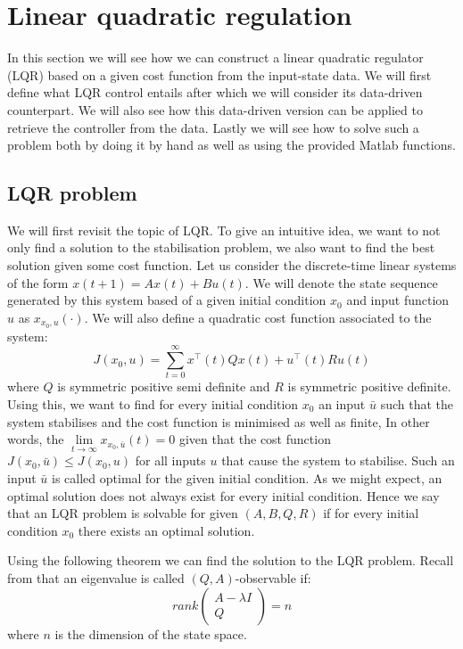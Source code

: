 \section{Linear quadratic regulation}
In this section we will see how we can construct a linear quadratic regulator (LQR) based on a given cost function from the input-state data. We will first define what LQR control entails after which we will consider its data-driven counterpart. We will also see how this data-driven version can be applied to retrieve the controller from the data. Lastly we will see how to solve such a problem both by doing it by hand as well as using the provided Matlab functions.

\subsection{LQR problem}
We will first revisit the topic of LQR. To give an intuitive idea, we want to not only find a solution to the stabilisation problem, we also want to find the best solution given some cost function. Let us consider the discrete-time linear systems of the form $x(t+1) = Ax(t) + Bu(t)$. We will denote the state sequence generated by this system based of a given initial condition $x_0$ and input function $u$ as $x_{x_0 , u}(\cdot)$. We will also define a quadratic cost function associated to the system:
\begin{equation*}
J(x_0 , u) = \sum_{t=0}^{\infty} x^\top (t) Q x (t) + u^\top (t) R u (t)
\end{equation*}
where $Q$ is symmetric positive semi definite and $R$ is symmetric positive definite. Using this, we want to find for every initial condition $x_0$ an input $\bar{u}$ such that the system stabilises and the cost function is minimised as well as finite, In other words, the $\lim\limits_{t \to \infty} x_{x_0 , \bar{u}}(t) = 0$ given that the cost function $J(x_0 , \bar{u}) \leq J(x_0 , u)$ for all inputs $u$ that cause the system to stabilise. Such an input $\bar{u}$ is called optimal for the given initial condition. As we might expect, an optimal solution does not always exist for every initial condition. Hence we say that an LQR problem is solvable for given $(A,B,Q,R)$ if for every initial condition $x_0$ there exists an optimal solution.

Using the following theorem we can find the solution to the LQR problem. Recall from \cite[Def 3.12]{bookTrentelman} that an eigenvalue is called $(Q,A)$-observable if:
$$rank\begin{pmatrix}A - \lambda I \\ Q \end{pmatrix} = n$$
where $n$ is the dimension of the state space.

